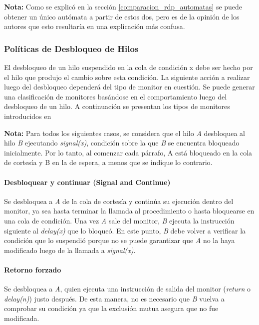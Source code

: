 \begin{framed}
\textbf{Nota:} Como se explicó en la sección \ref{comparacion_rdp_automatas} se
puede obtener un único autómata a partir de estos dos, pero es de la opinión de los autores
que esto resultaría en una explicación más confusa.
\end{framed}

\subsubsection{Políticas de Desbloqueo de Hilos}
\label{politica_monitor}
El desbloqueo de un hilo suspendido en la cola de condición x debe ser hecho
por el hilo que produjo el cambio sobre esta condición. La siguiente acción a
realizar luego del desbloqueo dependerá del tipo de monitor en cuestión.
Se puede generar una clasificación de monitores basándose en el comportamiento
luego del desbloqueo de un hilo. A continuación se presentan los tipos de
monitores introducidos en \cite{PalmaConcurrente}

\begin{framed}
\textbf{Nota:} Para todos los siguientes casos, se considera que el hilo
\textit{A} desbloquea al hilo \textit{B} ejecutando \textit{signal(x)},
condición sobre la que \textit{B} se encuentra bloqueado inicialmente. Por lo
tanto, al comenzar cada párrafo, A está bloqueado en la cola de cortesía y B en
la de espera, a menos que se indique lo contrario.
\end{framed}

\paragraph{Desbloquear y continuar (Signal and Continue)}
Se desbloquea a \textit{A} de la cola de cortesía y continúa su ejecución dentro
del monitor, ya sea hasta terminar la llamada al procedimiento o hasta bloquearse
en una cola de condición. Una vez \textit{A} sale del monitor, \textit{B}
ejecuta la instrucción siguiente al \textit{delay(x)} que lo bloqueó. En este
punto, \textit{B} debe volver a verificar la condición que lo suspendió porque
no se puede garantizar que \textit{A} no la haya modificado luego de la llamada
a \textit{signal(x)}.

\paragraph{Retorno forzado}
Se desbloquea a \textit{A}, quien ejecuta una instrucción de salida del monitor
(\textit{return} o \textit{delay(n)}) justo después. De esta manera, no es
necesario que \textit{B} vuelva a comprobar su condición ya que la exclusión
mutua asegura que no fue modificada.


